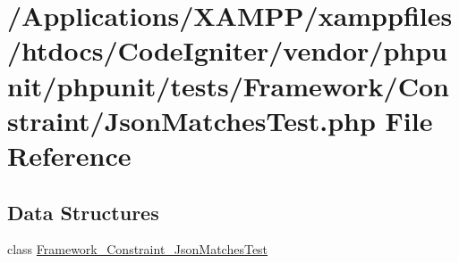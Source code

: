 \hypertarget{_json_matches_test_8php}{}\section{/\+Applications/\+X\+A\+M\+P\+P/xamppfiles/htdocs/\+Code\+Igniter/vendor/phpunit/phpunit/tests/\+Framework/\+Constraint/\+Json\+Matches\+Test.php File Reference}
\label{_json_matches_test_8php}
\subsection*{Data Structures}
\begin{DoxyCompactItemize}
\item 
class \mbox{\hyperlink{class_framework___constraint___json_matches_test}{Framework\+\_\+\+Constraint\+\_\+\+Json\+Matches\+Test}}
\end{DoxyCompactItemize}
